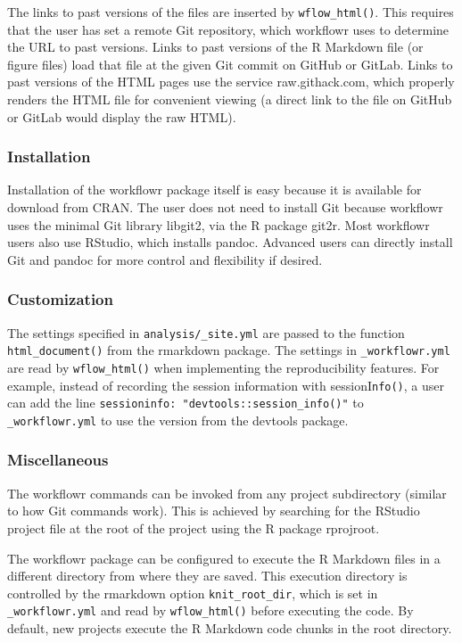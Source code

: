 \documentclass[9pt,a4paper]{extarticle}
\begin{document}
The links to past versions of the files are inserted by \verb|wflow_html()|.
This requires that the user has set a remote Git repository, which
workflowr uses to determine the URL to past versions. Links to past
versions of the R Markdown file (or figure files) load that file at the
given Git commit on GitHub or GitLab. Links to past versions of the HTML
pages use the service raw.githack.com, which properly renders the HTML
file for convenient viewing (a direct link to the file on GitHub or
GitLab would display the raw HTML).

\subsubsection*{Installation}

Installation of the workflowr package itself is easy because it is
available for download from CRAN. The user does not need to install Git
because workflowr uses the minimal Git library libgit2, via the R
package git2r. Most workflowr users also use RStudio, which installs
pandoc. Advanced users can directly install Git and pandoc for more
control and flexibility if desired.

\subsubsection*{Customization}

The settings specified in \verb|analysis/_site.yml| are passed to the
function \verb|html_document()| from the rmarkdown package. The settings in
\verb|_workflowr.yml| are read by \verb|wflow_html()| when implementing the
reproducibility features. For example, instead of recording the session
information with sessionI\verb|nfo()|, a user can add the line
\verb|sessioninfo: "devtools::session_info()"| to \verb|_workflowr.yml|
to use the version from the devtools package.

\subsubsection*{Miscellaneous}

The workflowr commands can be invoked from any project subdirectory
(similar to how Git commands work). This is achieved by searching for
the RStudio project file at the root of the project using the R package
rprojroot.

The workflowr package can be configured to execute the R Markdown files
in a different directory from where they are saved. This execution
directory is controlled by the rmarkdown option \verb|knit_root_dir|,
which is set in \verb| _workflowr.yml| and read by \verb|wflow_html()| before
executing the code. By default, new projects execute the R Markdown code
chunks in the root directory.
\end{document}

